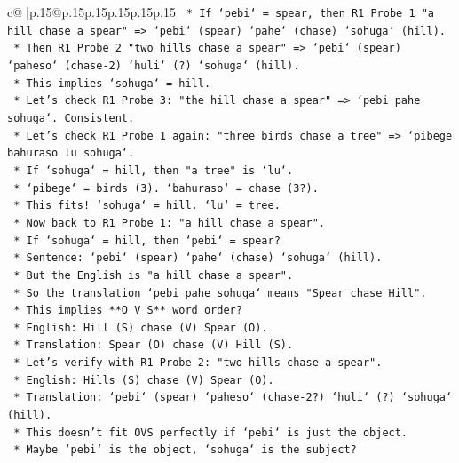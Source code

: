 \documentclass{article}
\begin{document}
{\begin{supertabular}{c@{$\;$}|p{.15\linewidth}@{}p{.15\linewidth}p{.15\linewidth}p{.15\linewidth}p{.15\linewidth}p{.15\linewidth}}
{{{\texttt{            *   If `pebi` = spear, then R1 Probe 1 "a hill chase a spear" => `pebi` (spear) `pahe` (chase) `sohuga` (hill).} \\
\texttt{            *   Then R1 Probe 2 "two hills chase a spear" => `pebi` (spear) `paheso` (chase{-}2) `huli` (?) `sohuga` (hill).} \\
\texttt{            *   This implies `sohuga` = hill.} \\
\texttt{            *   Let's check R1 Probe 3: "the hill chase a spear" => `pebi pahe sohuga`. Consistent.} \\
\texttt{            *   Let's check R1 Probe 1 again: "three birds chase a tree" => `pibege bahuraso lu sohuga`.} \\
\texttt{                *   If `sohuga` = hill, then "a tree" is `lu`.} \\
\texttt{                *   `pibege` = birds (3). `bahuraso` = chase (3?).} \\
\texttt{                *   This fits! `sohuga` = hill. `lu` = tree.} \\
\texttt{            *   Now back to R1 Probe 1: "a hill chase a spear".} \\
\texttt{                *   If `sohuga` = hill, then `pebi` = spear?} \\
\texttt{                *   Sentence: `pebi` (spear) `pahe` (chase) `sohuga` (hill).} \\
\texttt{                *   But the English is "a hill chase a spear".} \\
\texttt{                *   So the translation `pebi pahe sohuga` means "Spear chase Hill".} \\
\texttt{                *   This implies **O V S** word order?} \\
\texttt{                *   English: Hill (S) chase (V) Spear (O).} \\
\texttt{                *   Translation: Spear (O) chase (V) Hill (S).} \\
\texttt{                *   Let's verify with R1 Probe 2: "two hills chase a spear".} \\
\texttt{                    *   English: Hills (S) chase (V) Spear (O).} \\
\texttt{                    *   Translation: `pebi` (spear) `paheso` (chase{-}2?) `huli` (?) `sohuga` (hill).} \\
\texttt{                    *   This doesn't fit OVS perfectly if `pebi` is just the object.} \\
\texttt{                    *   Maybe `pebi` is the object, `sohuga` is the subject?} \\
}}}
\end{supertabular}}
\end{document}
